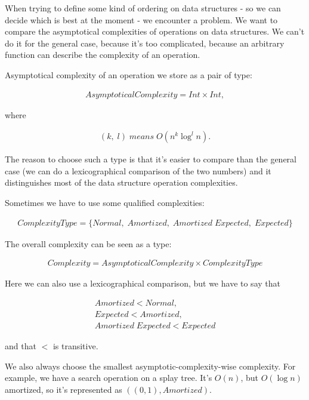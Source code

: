 \documentclass[11pt]{article}
\begin{document}
		When trying to define some kind of ordering on data structures - so we can decide which is best at the
		moment - we encounter a problem.  We want to compare the asymptotical complexities of operations on data
		structures.  We can't do it for the general case, because it's too complicated, because an arbitrary
		function can describe the complexity of an operation.

		Asymptotical complexity of an operation we store as a pair of type:

		\begin{eqnarray}
			AsymptoticalComplexity = Int \times Int,
		\end{eqnarray}

		where

		\begin{eqnarray}
			(k, \; l) \; means \; O(n^k \log^l{ n}).
		\end{eqnarray}

		The reason to choose such a type is that it's easier to compare than the general case (we can do a
		lexicographical comparison of the two numbers) and it distinguishes most of the data structure operation
		complexities.

		Sometimes we have to use some qualified complexities:

		\begin{eqnarray}
			ComplexityType = \{ Normal, \; Amortized, \; Amortized \;Expected, \; Expected \}
		\end{eqnarray}

		The overall complexity can be seen as a type:

		\begin{eqnarray}
			Complexity = AsymptoticalComplexity \times ComplexityType
		\end{eqnarray}

		Here we can also use a lexicographical comparison, but we have to say that

		\begin{eqnarray}
			Amortized < Normal,\\
			Expected < Amortized,\\
			Amortized \; Expected < Expected
		\end{eqnarray}

		and that $<$ is transitive.

		We also always choose the smallest asymptotic-complexity-wise complexity.  For example, we have a search
		operation on a splay tree. It's $O(n)$, but $O(\log n)$ amortized, so it's represented as
		$((0,1),Amortized)$.
\end{document}
